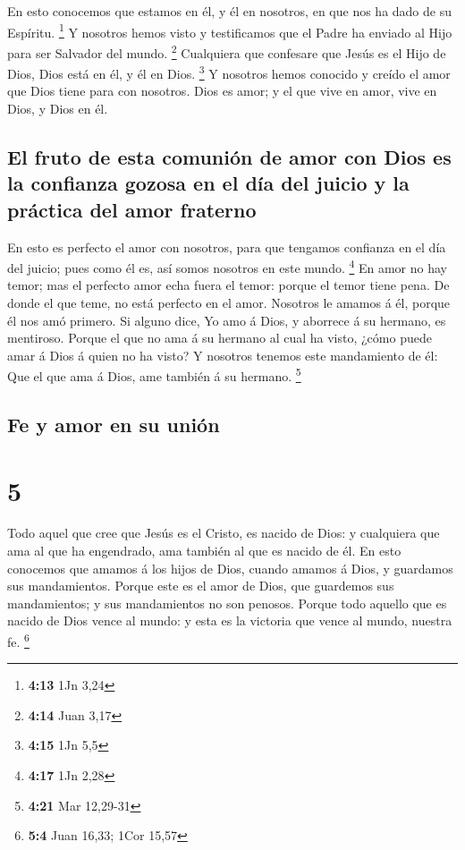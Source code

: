  En esto conocemos que estamos en él, y él en nosotros, en
que nos ha dado de su Espíritu. \footnote{\textbf{4:13} 1Jn 3,24}
 Y nosotros hemos visto y testificamos que el Padre ha
enviado al Hijo para ser Salvador del mundo. \footnote{\textbf{4:14}
  Juan 3,17}  Cualquiera que confesare que Jesús es el Hijo
de Dios, Dios está en él, y él en Dios. \footnote{\textbf{4:15} 1Jn 5,5}
 Y nosotros hemos conocido y creído el amor que Dios tiene
para con nosotros. Dios es amor; y el que vive en amor, vive en Dios, y
Dios en él.

\hypertarget{el-fruto-de-esta-comuniuxf3n-de-amor-con-dios-es-la-confianza-gozosa-en-el-duxeda-del-juicio-y-la-pruxe1ctica-del-amor-fraterno}{%
\subsection{El fruto de esta comunión de amor con Dios es la confianza
gozosa en el día del juicio y la práctica del amor
fraterno}\label{el-fruto-de-esta-comuniuxf3n-de-amor-con-dios-es-la-confianza-gozosa-en-el-duxeda-del-juicio-y-la-pruxe1ctica-del-amor-fraterno}}

 En esto es perfecto el amor con nosotros, para que
tengamos confianza en el día del juicio; pues como él es, así somos
nosotros en este mundo. \footnote{\textbf{4:17} 1Jn 2,28} 
En amor no hay temor; mas el perfecto amor echa fuera el temor: porque
el temor tiene pena. De donde el que teme, no está perfecto en el amor.
 Nosotros le amamos á él, porque él nos amó primero.
 Si alguno dice, Yo amo á Dios, y aborrece á su hermano, es
mentiroso. Porque el que no ama á su hermano al cual ha visto, ¿cómo
puede amar á Dios á quien no ha visto?  Y nosotros tenemos
este mandamiento de él: Que el que ama á Dios, ame también á su hermano.
\footnote{\textbf{4:21} Mar 12,29-31}

\hypertarget{fe-y-amor-en-su-uniuxf3n}{%
\subsection{Fe y amor en su unión}\label{fe-y-amor-en-su-uniuxf3n}}

\hypertarget{section-4}{%
\section{5}\label{section-4}}

 Todo aquel que cree que Jesús es el Cristo, es nacido de
Dios: y cualquiera que ama al que ha engendrado, ama también al que es
nacido de él.  En esto conocemos que amamos á los hijos de
Dios, cuando amamos á Dios, y guardamos sus mandamientos. 
Porque este es el amor de Dios, que guardemos sus mandamientos; y sus
mandamientos no son penosos.  Porque todo aquello que es
nacido de Dios vence al mundo: y esta es la victoria que vence al mundo,
nuestra fe. \footnote{\textbf{5:4} Juan 16,33; 1Cor 15,57}


